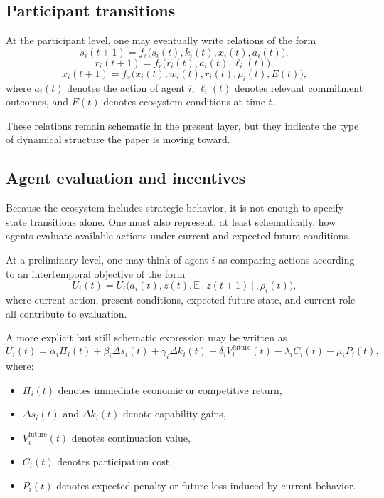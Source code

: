 \documentclass[11pt]{article}
\begin{document}
\subsection{Participant transitions}

At the participant level, one may eventually write relations of the form
\[
s_i(t+1) = f_s\big(s_i(t), k_i(t), x_i(t), a_i(t)\big),
\]
\[
r_i(t+1) = f_r\big(r_i(t), a_i(t), \ell_i(t)\big),
\]
\[
x_i(t+1) = f_x\big(x_i(t), w_i(t), r_i(t), \rho_i(t), E(t)\big),
\]
where \(a_i(t)\) denotes the action of agent \(i\), \(\ell_i(t)\) denotes relevant commitment outcomes, and \(E(t)\) denotes ecosystem conditions at time \(t\).

These relations remain schematic in the present layer, but they indicate the type of dynamical structure the paper is moving toward.

\subsection{Agent evaluation and incentives}

Because the ecosystem includes strategic behavior, it is not enough to specify state transitions alone. One must also represent, at least schematically, how agents evaluate available actions under current and expected future conditions.

At a preliminary level, one may think of agent \(i\) as comparing actions according to an intertemporal objective of the form
\[
U_i(t) = U_i\big(a_i(t), z(t), \mathbb{E}[z(t+1)], \rho_i(t)\big),
\]
where current action, present conditions, expected future state, and current role all contribute to evaluation.

A more explicit but still schematic expression may be written as
\[
U_i(t)
= \alpha_i \Pi_i(t)
+ \beta_i \Delta s_i(t)
+ \gamma_i \Delta k_i(t)
+ \delta_i V_i^{\mathrm{future}}(t)
- \lambda_i C_i(t)
- \mu_i P_i(t),
\]
where:
\begin{itemize}
  \item \(\Pi_i(t)\) denotes immediate economic or competitive return,
  \item \(\Delta s_i(t)\) and \(\Delta k_i(t)\) denote capability gains,
  \item \(V_i^{\mathrm{future}}(t)\) denotes continuation value,
  \item \(C_i(t)\) denotes participation cost,
  \item \(P_i(t)\) denotes expected penalty or future loss induced by current behavior.
\end{itemize}
\end{document}
